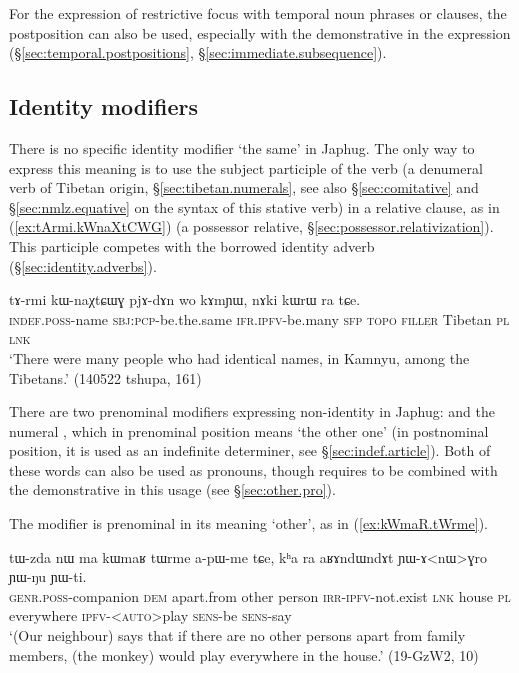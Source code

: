 For the expression of restrictive focus with temporal noun phrases or clauses, the postposition  can also be used, especially with the demonstrative in the expression  (§\ref{sec:temporal.postpositions}, §\ref{sec:immediate.subsequence}).



\subsection{Identity modifiers} \label{sec:identity.modifier}
There is no specific identity modifier `the same' in Japhug. The only way to express this meaning is to use the subject participle of the verb  (a denumeral verb of Tibetan origin, §\ref{sec:tibetan.numerals}, see also §\ref{sec:comitative} and §\ref{sec:nmlz.equative} on the syntax of this stative verb) in a relative clause, as in (\ref{ex:tArmi.kWnaXtCWG}) (a possessor relative, §\ref{sec:possessor.relativization}). This participle competes with the borrowed identity adverb  (§\ref{sec:identity.adverbs}).

\begin{exe}
\ex \label{ex:tArmi.kWnaXtCWG}
\gll tɤ-rmi kɯ-naχtɕɯɣ pjɤ-dɤn wo kɤmɲɯ, nɤki kɯrɯ ra tɕe. \\
\textsc{indef}.\textsc{poss}-name \textsc{sbj}:\textsc{pcp}-be.the.same \textsc{ifr}.\textsc{ipfv}-be.many \textsc{sfp}  \textsc{topo} \textsc{filler} Tibetan \textsc{pl} \textsc{lnk} \\
\glt `There were many people who had identical names, in Kamnyu, among the Tibetans.' (140522 tshupa, 161)
\end{exe}


There are two prenominal modifiers expressing non-identity in Japhug:  and the numeral , which in prenominal position means `the other one' (in postnominal position, it is used as an indefinite determiner, see §\ref{sec:indef.article}). Both of these words can also be used as pronouns, though  requires to be combined with the demonstrative  in this usage (see §\ref{sec:other.pro}).

The modifier  is prenominal in its meaning `other', as in (\ref{ex:kWmaR.tWrme}). 

\begin{exe}
\ex \label{ex:kWmaR.tWrme}
\gll tɯ-zda nɯ ma kɯmaʁ tɯrme a-pɯ-me tɕe, kʰa ra aʁɤndɯndɤt ɲɯ-ɤ<nɯ>ɣro ɲɯ-ŋu ɲɯ-ti. \\
\textsc{genr}.\textsc{poss}-companion \textsc{dem} apart.from other person \textsc{irr}-\textsc{ipfv}-not.exist \textsc{lnk} house \textsc{pl} everywhere \textsc{ipfv}-<\textsc{auto}>play \textsc{sens}-be \textsc{sens}-say \\
\glt `(Our neighbour) says that if there are no other persons apart from family members, (the monkey) would play everywhere in the house.' (19-GzW2, 10)
\end{exe}

